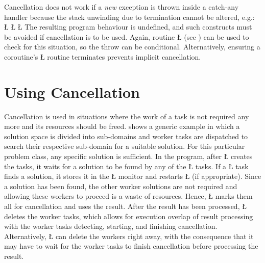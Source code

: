 \documentclass[openright,twoside]{report}
\begin{document}
Cancellation does not work if a \emph{new} exception is thrown inside a catch-any handler because the stack unwinding due to termination cannot be altered, e.g.:
\LGinlinefalse\LGbegin\lgrinde
\L{}
\L{\LB{}}
\L{\LB{\}}}
\endlgrinde\LGend
The resulting program behaviour is undefined, and such constructs must be avoided if cancellation is to be used.
Again, routine \LGinlinetrue\LGbegin\lgrinde\L{}\endlgrinde\LGend{} (see ) can be used to check for this situation, so the throw can be conditional.
Alternatively, ensuring a coroutine's \LGinlinetrue\LGbegin\lgrinde\L{}\endlgrinde\LGend{} routine terminates prevents implicit cancellation.


\section{Using Cancellation}

Cancellation is used in situations where the work of a task is not required any more and its resources should be freed.
 shows a generic example in which a solution space is divided into sub-domains and worker tasks are dispatched to search their respective sub-domain for a suitable solution.
For this particular problem class, any specific solution is sufficient.
In the program, after \LGinlinetrue\LGbegin\lgrinde\L{}\endlgrinde\LGend{} creates the tasks, it waits for a solution to be found by any of the \LGinlinetrue\LGbegin\lgrinde\L{}\endlgrinde\LGend{} tasks.
If a \LGinlinetrue\LGbegin\lgrinde\L{}\endlgrinde\LGend{} task finds a solution, it stores it in the \LGinlinetrue\LGbegin\lgrinde\L{}\endlgrinde\LGend{} monitor and restarts \LGinlinetrue\LGbegin\lgrinde\L{}\endlgrinde\LGend{} (if appropriate).
Since a solution has been found, the other worker solutions are not required and allowing these workers to proceed is a waste of resources.
Hence, \LGinlinetrue\LGbegin\lgrinde\L{}\endlgrinde\LGend{} marks them all for cancellation and uses the result.
After the result has been processed, \LGinlinetrue\LGbegin\lgrinde\L{}\endlgrinde\LGend{} deletes the worker tasks, which allows for execution overlap of result processing with the worker tasks detecting, starting, and finishing cancellation.
Alternatively, \LGinlinetrue\LGbegin\lgrinde\L{}\endlgrinde\LGend{} can delete the workers right away, with the consequence that it may have to wait for the worker tasks to finish cancellation before processing the result.
\end{document}
